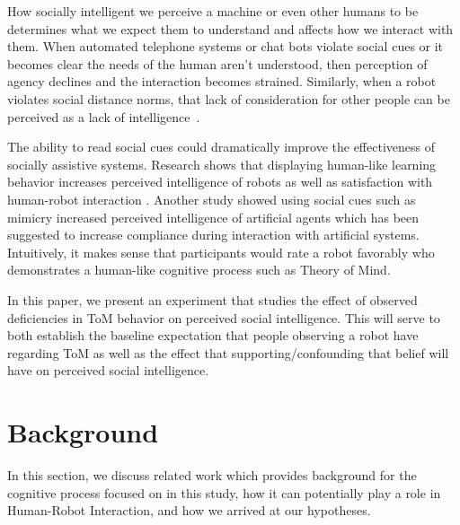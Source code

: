 \documentclass[letterpaper, 10 pt, conference]{ieeeconf}  %
\begin{document}
How socially intelligent we perceive a machine or even other humans to be determines what we expect them to understand and affects how we interact with them. When automated telephone systems or chat bots violate social cues or it becomes clear the  needs of the human aren't understood, then perception of agency declines and the interaction becomes strained\cite{Wallis, IJoC6277}. Similarly, when a robot violates social distance norms, that lack of consideration for other people can be perceived as a lack of intelligence~\cite{forer2018socially-aware, feil-seifer2012distance-based}.

The ability to read social cues could dramatically improve the effectiveness of socially assistive systems. Research shows that displaying human-like learning behavior increases perceived intelligence of robots as well as satisfaction with human-robot interaction \cite{Rosenthal-von}. Another study showed using social cues such as mimicry increased perceived intelligence of artificial agents which has been suggested to increase compliance during interaction with artificial systems\cite{Kaptein}. Intuitively, it makes sense that participants would rate a robot favorably who demonstrates a human-like cognitive process such as Theory of Mind. 

In this paper, we present an experiment that studies the effect of observed deficiencies in ToM behavior on perceived social intelligence. This will serve to both establish the baseline expectation that people observing a robot have regarding ToM as well as the effect that supporting/confounding that belief will have on perceived social intelligence.



\section{Background}
 In this section, we discuss related work which provides background for the cognitive process focused on in this study, how it can potentially play a role in Human-Robot Interaction, and how we arrived at our hypotheses.
 
\end{document}
